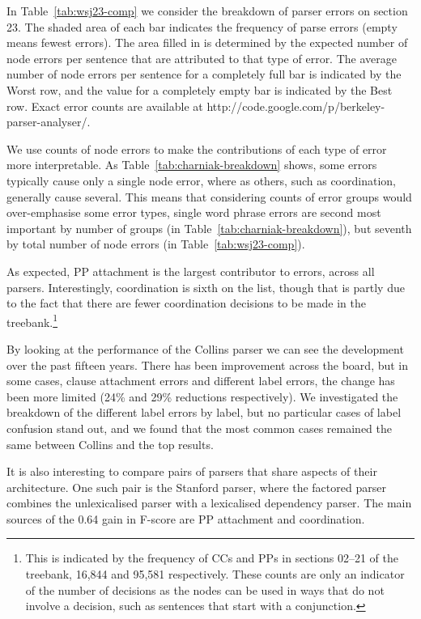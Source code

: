 \begin{landscape}

\end{landscape}

In Table~\ref{tab:wsj23-comp} we consider the breakdown of parser errors on
\wsj section 23.  The shaded area of each bar indicates the frequency of parse
errors (\myie empty means fewest errors).  The area filled in is determined by
the expected number of node errors per sentence that are attributed to that
type of error.  The average number of node errors per sentence for a completely
full bar is indicated by the Worst row, and the value for a completely empty
bar is indicated by the Best row. Exact error counts are available at
http://code.google.com/p/berkeley-parser-analyser/.

We use counts of node errors to make the contributions of each type of error
more interpretable.  As Table~\ref{tab:charniak-breakdown} shows, some errors
typically cause only a single node error, where as others, such as
coordination, generally cause several.  This means that considering counts of
error groups would over-emphasise some error types, \myeg single word phrase
errors are second most important by number of groups (in
Table~\ref{tab:charniak-breakdown}), but seventh by total number of node errors
(in Table~\ref{tab:wsj23-comp}).

As expected, PP attachment is the largest contributor to errors, across all
parsers.  Interestingly, coordination is sixth on the list, though that is
partly due to the fact that there are fewer coordination decisions to be made
in the treebank.\footnote{This is indicated by the frequency of CCs and PPs in
sections 02--21 of the treebank, 16,844 and 95,581 respectively.  These counts
are only an indicator of the number of decisions as the nodes can be used in
ways that do not involve a decision, such as sentences that start with a
conjunction.}

By looking at the performance of the Collins parser we can see the development
over the past fifteen years.  There has been improvement across
the board, but in some cases, \myeg clause attachment errors and different label
errors, the change has been more limited (24\% and 29\% reductions respectively).  We
investigated the breakdown of the different label errors by label, but no
particular cases of label confusion stand out, and we found that the most
common cases remained the same between Collins and the top results.

It is also interesting to compare pairs of parsers that share aspects of their
architecture.  One such pair is the Stanford parser, where the factored parser
combines the unlexicalised parser with a lexicalised dependency parser.  The
main sources of the 0.64 gain in F-score are PP attachment and coordination.

